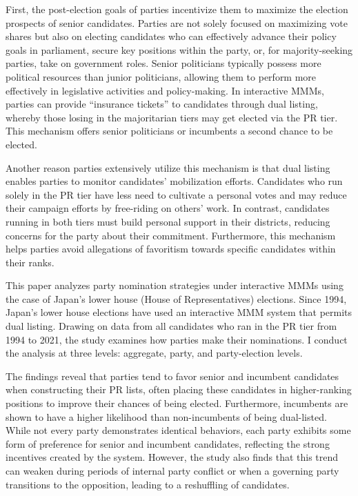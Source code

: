 \documentclass[a4paper, 11pt]{article}
\begin{document}
First, the post-election goals of parties incentivize them to maximize the election prospects of senior candidates. Parties are not solely focused on maximizing vote shares but also on electing candidates who can effectively advance their policy goals in parliament, secure key positions within the party, or, for majority-seeking parties, take on government roles. Senior politicians typically possess more political resources than junior politicians, allowing them to perform more effectively in legislative activities and policy-making. In interactive MMMs, parties can provide “insurance tickets” to candidates through dual listing, whereby those losing in the majoritarian tiers may get elected via the PR tier. This mechanism offers senior politicians or incumbents a second chance to be elected.

Another reason parties extensively utilize this mechanism is that dual listing enables parties to monitor candidates' mobilization efforts. Candidates who run solely in the PR tier have less need to cultivate a personal votes and may reduce their campaign efforts by free-riding on others’ work. In contrast, candidates running in both tiers must build personal support in their districts, reducing concerns for the party about their commitment. Furthermore, this mechanism helps parties avoid allegations of favoritism towards specific candidates within their ranks.

This paper analyzes party nomination strategies under interactive MMMs using the case of Japan’s lower house (House of Representatives) elections. Since 1994, Japan’s lower house elections have used an interactive MMM system that permits dual listing. Drawing on data from all candidates who ran in the PR tier from 1994 to 2021, the study examines how parties make their nominations. I conduct the analysis at three levels: aggregate, party, and party-election levels.

The findings reveal that parties tend to favor senior and incumbent candidates when constructing their PR lists, often placing these candidates in higher-ranking positions to improve their chances of being elected. Furthermore, incumbents are shown to have a higher likelihood than non-incumbents of being dual-listed. While not every party demonstrates identical behaviors, each party exhibits some form of preference for senior and incumbent candidates, reflecting the strong incentives created by the system. However, the study also finds that this trend can weaken during periods of internal party conflict or when a governing party transitions to the opposition, leading to a reshuffling of candidates. 
\end{document}
